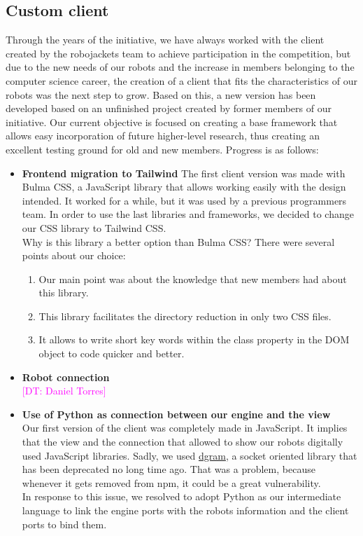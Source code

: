 \documentclass{llncs}
\newcommand{\DT}[1]{{\textcolor{magenta}{[DT: #1]}}}%
\begin{document}
\subsection{Custom client}
Through the years of the initiative, we have always worked with the client created by the robojackets team to achieve participation in the competition, but due to the new needs of our robots and the increase in members belonging to the computer science career, the creation of a client that fits the characteristics of our robots was the next step to grow. Based on this, a new version has been developed based on an unfinished project created by former members of our initiative. Our current objective is focused on creating a base framework that allows easy incorporation of future higher-level research, thus creating an excellent testing ground for old and new members. Progress is as follows:

\begin{itemize}
    \item \textbf{Frontend migration to Tailwind}
    The first client version was made with Bulma CSS, a JavaScript library that allows working easily with the design intended. It worked for a while, but it was used by a previous programmers team. In order to use the last libraries and frameworks, we decided to change our CSS library to Tailwind CSS.
    \\

    Why is this library a better option than Bulma CSS? There were several points about our choice:
    \begin{enumerate}
        \item Our main point was about the knowledge that new members had about this library.
        \item This library facilitates the directory reduction in only two CSS files.
        \item It allows to write short key words within the class property in the DOM object to code quicker and better.        
    \end{enumerate}
    
    \item \textbf{Robot connection}
    \\
    \DT{Daniel Torres}
    
    \item \textbf{Use of Python as connection between our engine and the view}\\

    Our first version of the client was completely made in JavaScript. It implies that the view and the connection that allowed to show our robots digitally used JavaScript libraries. Sadly, we used \href{https://www.npmjs.com/package/dgram}{dgram}, a socket oriented library that has been deprecated no long time ago. That was a problem, because whenever it gets removed from npm, it could be a great vulnerability. \\[2pt]

    In response to this issue, we resolved to adopt Python as our intermediate language to link the engine ports with the robots information and the client ports to bind them.
    
\end{itemize}
\end{document}
